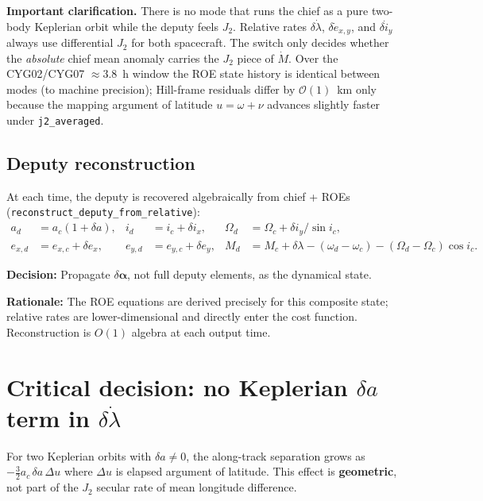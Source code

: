 \documentclass[11pt]{article}
\begin{document}
\textbf{Important clarification.} There is no mode that runs the chief as a pure two-body Keplerian orbit while the deputy feels $J_2$. Relative rates $\delta\dot\lambda$, $\delta\dot e_{x,y}$, and $\delta\dot i_y$ always use differential $J_2$ for both spacecraft. The switch only decides whether the \emph{absolute} chief mean anomaly carries the $J_2$ piece of $\dot M$. Over the CYG02/CYG07 $\approx 3.8$~h window the ROE state history is identical between modes (to machine precision); Hill-frame residuals differ by $\mathcal{O}(1)$~km only because the mapping argument of latitude $u=\omega+\nu$ advances slightly faster under \texttt{j2\_averaged}.

\subsection{Deputy reconstruction}

At each time, the deputy is recovered algebraically from chief + ROEs (\texttt{reconstruct\_deputy\_from\_relative}):
\begin{align}
a_d &= a_c(1+\delta a), &
i_d &= i_c + \delta i_x, &
\Omega_d &= \Omega_c + \delta i_y/\sin i_c, \\
e_{x,d} &= e_{x,c}+\delta e_x, &
e_{y,d} &= e_{y,c}+\delta e_y, &
M_d &= M_c + \delta\lambda - (\omega_d-\omega_c) - (\Omega_d-\Omega_c)\cos i_c.
\end{align}

\textbf{Decision:} Propagate $\delta\bm{\alpha}$, not full deputy elements, as the dynamical state.

\textbf{Rationale:} The ROE equations are derived precisely for this composite state; relative rates are lower-dimensional and directly enter the cost function. Reconstruction is $O(1)$ algebra at each output time.

\section{Critical decision: no Keplerian $\delta a$ term in $\delta\dot\lambda$}

For two Keplerian orbits with $\delta a \neq 0$, the along-track separation grows as $-\tfrac{3}{2} a_c \,\delta a\,\Delta u$ where $\Delta u$ is elapsed argument of latitude. This effect is \textbf{geometric}, not part of the $J_2$ secular rate of mean longitude difference.
\end{document}
